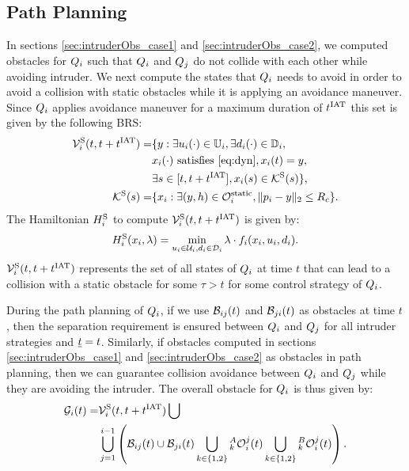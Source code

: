 \subsection{Path Planning} \label{sec:path_planning}
In sections \ref{sec:intruderObs_case1} and \ref{sec:intruderObs_case2}, we computed obstacles for $Q_i$ such that $Q_i$ and $Q_j$ do not collide with each other while avoiding intruder. We next compute the states that $Q_i$ needs to avoid in order to avoid a collision with static obstacles while it is applying an avoidance maneuver. Since $Q_i$ applies avoidance maneuver for a maximum duration of $t^\text{IAT}$ this set is given by the following BRS:
\begin{equation} \label{eq:ObsBRS_static}
\begin{aligned}
\brs^{\text{S}}_{i}(t, t+\iat) = & \{y: \exists \ctrl_i(\cdot) \in \cfset_i, \exists \dstb_i(\cdot) \in \dfset_i, \\
& \state_i(\cdot) \text{ satisfies \eqref{eq:dyn}}, \state_i(t) = y, \\
& \exists s \in [t, t+\iat], \state_i(s) \in \mathcal{K}^{\text{S}}(s) \},\\
\mathcal{K}^{\text{S}}(s) = & \{\state_i: \exists (y, h) \in \soset_i, \|\pos_i - y\|_2 \le \rc \}.
\end{aligned}
\end{equation}
The Hamiltonian $H^{\text{S}}_{i}$ to compute $\mathcal{V}^{\text{S}}_{i}(t, t+t^\text{IAT})$ is given by:
\begin{equation} \label{eqn:BRS_obsham_static}
\ham^{\text{S}}_{i}(\state_i, \costate) = \min_{\ctrl_i \in \cset_i, \dstb_i \in \dset_i} \costate \cdot f_i (\state_i, \ctrl_i, \dstb_i).
\end{equation}
$\mathcal{V}^{\text{S}}_{i}(t, t+t^\text{IAT})$ represents the set of all states of $Q_i$ at time $t$ that can lead to a collision with a static obstacle for some $\tau > t$ for some control strategy of $Q_i$.

During the path planning of $Q_i$, if we use $\mathcal{B}_{ij}(t)$ and $\mathcal{B}_{ji}(t)$ as obstacles at time $t$, then the separation requirement is ensured between $Q_i$ and $Q_j$ for all intruder strategies and $\underline{t} = t$. Similarly, if obstacles computed in sections \ref{sec:intruderObs_case1} and \ref{sec:intruderObs_case2} as obstacles in path planning, then we can guarantee collision avoidance between $Q_i$ and $Q_j$ while they are avoiding the intruder. The overall obstacle for $Q_i$ is thus given by:
\begin{equation} \label{eq:obsseti_intr}
\begin{aligned}
\obsset_i(t)  =  & \brs^{\text{S}}_{i}(t, t+\iat) \bigcup \\
& \bigcup_{j=1}^{i-1} \left( \buff_{ij}(t) \cup \buff_{ji}(t) \bigcup_{k \in\{1, 2\}} {}_k^A\ioset_i^j(t) \bigcup_{k \in\{1, 2\}} {}_k^B\ioset_i^j(t) \right).
\end{aligned}
\end{equation}

